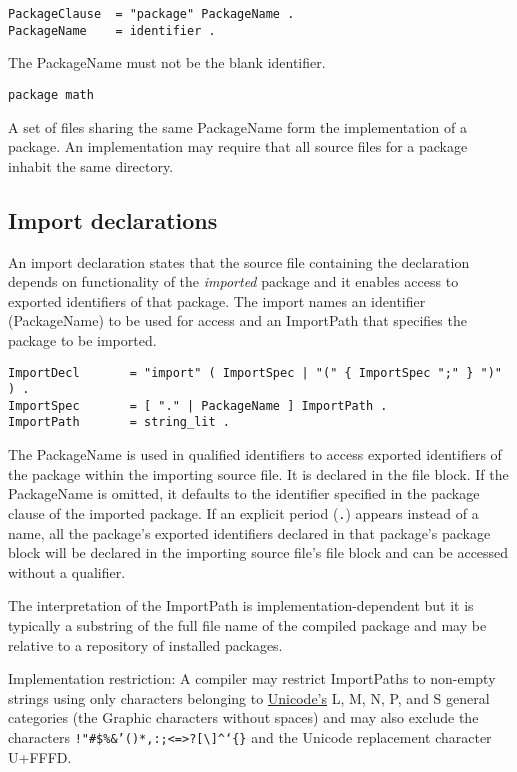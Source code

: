 \begin{Verbatim}[frame=single]
PackageClause  = "package" PackageName .
PackageName    = identifier .
\end{Verbatim}

The PackageName must not be the blank identifier.

\begin{Verbatim}[frame=single]
package math
\end{Verbatim}

A set of files sharing the same PackageName form the implementation of a
package. An implementation may require that all source files for a
package inhabit the same directory.

\subsection*{Import declarations}

An import declaration states that the source file containing the
declaration depends on functionality of the \emph{imported} package
and it enables access to exported identifiers of that package.  The
import names an identifier (PackageName) to be used for access and
an ImportPath that specifies the package to be imported.

\begin{Verbatim}[frame=single]
ImportDecl       = "import" ( ImportSpec | "(" { ImportSpec ";" } ")" ) .
ImportSpec       = [ "." | PackageName ] ImportPath .
ImportPath       = string_lit .
\end{Verbatim}

The PackageName is used in qualified identifiers to access exported
identifiers of the package within the importing source file. It is
declared in the file block. If the PackageName is omitted, it
defaults to the identifier specified in the package clause of the
imported package. If an explicit period (\texttt{.}) appears instead
of a name, all the package's exported identifiers declared in that
package's package block will be declared in the importing source
file's file block and can be accessed without a qualifier.

The interpretation of the ImportPath is implementation-dependent but it
is typically a substring of the full file name of the compiled package
and may be relative to a repository of installed packages.

Implementation restriction: A compiler may restrict ImportPaths to
non-empty strings using only characters belonging to
\href{http://www.unicode.org/versions/Unicode6.0.0/}{Unicode's} L, M, N,
P, and S general categories (the Graphic characters without spaces) and
may also exclude the characters
\texttt{!"\#\$\%\&'()*,:;\textless{}=\textgreater{}?{[}\textbackslash{}{]}\^{}`\{\textbar{}\}}
and the Unicode replacement character U+FFFD.

